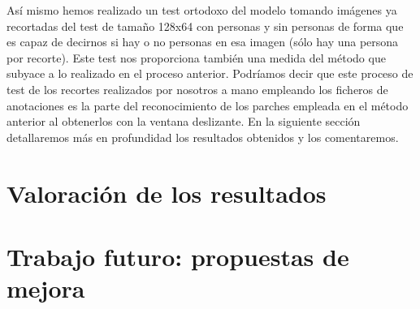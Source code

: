 \documentclass[a4paper,12pt]{article}
\begin{document}
Así mismo hemos realizado un test ortodoxo del modelo tomando imágenes ya recortadas del test de tamaño 128x64 con personas y sin personas de forma que es capaz de decirnos si hay o no personas en esa imagen (sólo hay una persona por recorte). Este test nos proporciona también una medida del método que subyace a lo realizado en el proceso anterior. Podríamos decir que este proceso de test de los recortes realizados por nosotros a mano empleando los ficheros de anotaciones es la parte del reconocimiento de los parches empleada en el método anterior al obtenerlos con la ventana deslizante. En la siguiente sección detallaremos más en profundidad los resultados obtenidos y los comentaremos.


\section{Valoración de los resultados}


\section{Trabajo futuro: propuestas de mejora}

\normalsize


%
%
\end{document}
